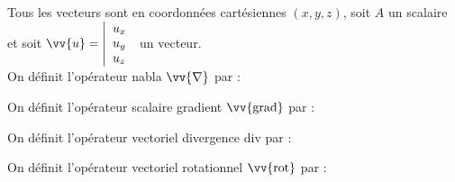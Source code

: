\documentclass[a4paper]{article}
\begin{document}
\pagestyle{fancy}
\fancyhf{}
\setlength{\headheight}{15pt}

\begin{center}
	\large{}
\end{center}


\setlength{\tabcolsep}{12pt}
\renewcommand{\arraystretch}{2.0}
Tous les vecteurs sont en coordonnées cartésiennes \((x,y,z)\), soit \(A\) un scalaire et soit \(\vv{u}=\left|\begin{array}{l} u_x\\ u_y\\ u_z\end{array}\right.\) un vecteur.\\
On définit l'opérateur nabla \(\vv{\nabla}\) par :\begin{center}\end{center}
On définit l'opérateur scalaire gradient \(\vv{\mathrm{grad}}\) par :\begin{center}\end{center}
On définit l'opérateur vectoriel divergence \(\mathrm{div}\) par :\begin{center}\end{center}
On définit l'opérateur vectoriel rotationnel \(\vv{\mathrm{rot}}\) par :\begin{center}\end{center}
\end{document}
